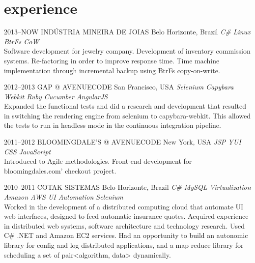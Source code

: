 \documentclass[]{friggeri-cv}
\begin{document}
\section{experience}

\begin{entrylist}


\entry
{2013--NOW}
{INDÚSTRIA MINEIRA DE JOIAS}
{Belo Horizonte, Brazil}
{\emph{\bullet C\# \bullet Linux \bullet BtrFs CoW  } \\ Software development for jewelry company. Development of inventory commission systems. Re-factoring in order to improve response time. Time machine implementation through incremental backup using BtrFs copy-on-write. }


\entry
{2012--2013}
{GAP @ AVENUECODE}
{San Francisco, USA}
{\emph{\bullet Selenium \bullet Capybara \bullet Webkit \bullet Ruby \bullet Cucumber \bullet AngularJS } \\ Expanded the functional tests and did a research and development that resulted in switching the rendering engine from selenium to capybara-webkit. This allowed the tests to run in  headless mode in the continuous integration pipeline.
}


\entry
{2011--2012}
{BLOOMINGDALE'S @ AVENUECODE}
{New York, USA}
{\emph{\bullet JSP \bullet YUI \bullet CSS \bullet JavaScript } \\ Introduced to Agile methodologies. Front-end development for bloomingdales.com' checkout project. 
}

\entry
{2010--2011}
{COTAK SISTEMAS}
{Belo Horizonte, Brazil}
{\emph{\bullet C\# \bullet MySQL \bullet Virtualization \bullet Amazon AWS \bullet UI Automation \bullet Selenium } \\ Worked in the development of a distributed computing cloud that automate UI web interfaces, designed to feed automatic insurance quotes. Acquired experience in distributed web systems, software architecture and technology research. Used C\# .NET and Amazon EC2 services. Had an opportunity to build an autonomic library for config and log distributed applications, and a map reduce library for scheduling a set of pair<algorithm, data> dynamically.
}


\end{entrylist}
\end{document}
